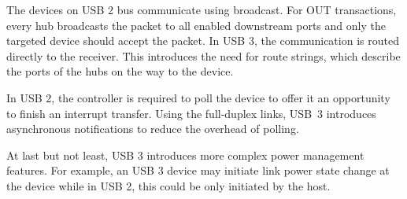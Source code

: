 The devices on USB 2 bus communicate using broadcast. For OUT transactions,
every hub broadcasts the packet to all enabled downstream ports and only the
targeted device should accept the packet. In USB 3, the communication is
routed directly to the receiver. This introduces the need for route strings,
which describe the ports of the hubs on the way to the device.

In USB 2, the controller is required to poll the device to offer it an
opportunity to finish an interrupt transfer. Using the full-duplex links, USB~3
introduces asynchronous notifications to reduce the overhead of polling.

At last but not least, USB 3 introduces more complex power management
features. For example, an USB 3 device may initiate link power state change at
the device while in USB 2, this could be only initiated by the host.

